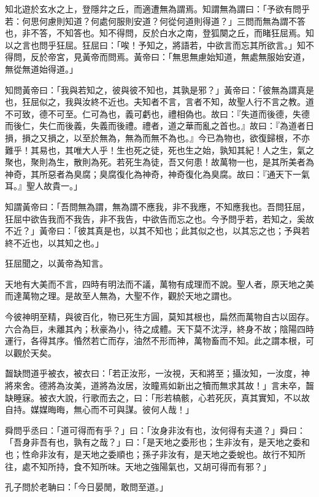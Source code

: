 
\begin{pinyinscope}
知北遊於玄水之上，登隱弅之丘，而適遭無為謂焉。知謂無為謂曰：「予欲有問乎若：何思何慮則知道？何處何服則安道？何從何道則得道？」三問而無為謂不答也，非不答，不知答也。知不得問，反於白水之南，登狐闋之丘，而睹狂屈焉。知以之言也問乎狂屈。狂屈曰：「唉！予知之，將語若，中欲言而忘其所欲言。」知不得問，反於帝宮，見黃帝而問焉。黃帝曰：「無思無慮始知道，無處無服始安道，無從無道始得道。」

知問黃帝曰：「我與若知之，彼與彼不知也，其孰是邪？」黃帝曰：「彼無為謂真是也，狂屈似之，我與汝終不近也。夫知者不言，言者不知，故聖人行不言之教。道不可致，德不可至。仁可為也，義可虧也，禮相偽也。故曰：『失道而後德，失德而後仁，失仁而後義，失義而後禮。禮者，道之華而亂之首也。』故曰：『為道者日損，損之又損之，以至於無為，無為而無不為也。』今已為物也，欲復歸根，不亦難乎！其易也，其唯大人乎！生也死之徒，死也生之始，孰知其紀！人之生，氣之聚也，聚則為生，散則為死。若死生為徒，吾又何患！故萬物一也，是其所美者為神奇，其所惡者為臭腐；臭腐復化為神奇，神奇復化為臭腐。故曰：『通天下一氣耳。』聖人故貴一。」

知謂黃帝曰：「吾問無為謂，無為謂不應我，非不我應，不知應我也。吾問狂屈，狂屈中欲告我而不我告，非不我告，中欲告而忘之也。今予問乎若，若知之，奚故不近？」黃帝曰：「彼其真是也，以其不知也；此其似之也，以其忘之也；予與若終不近也，以其知之也。」

狂屈聞之，以黃帝為知言。

天地有大美而不言，四時有明法而不議，萬物有成理而不說。聖人者，原天地之美而達萬物之理。是故至人無為，大聖不作，觀於天地之謂也。

今彼神明至精，與彼百化，物已死生方圓，莫知其根也，扁然而萬物自古以固存。六合為巨，未離其內；秋豪為小，待之成體。天下莫不沈浮，終身不故；陰陽四時運行，各得其序。惛然若亡而存，油然不形而神，萬物畜而不知。此之謂本根，可以觀於天矣。

齧缺問道乎被衣，被衣曰：「若正汝形，一汝視，天和將至；攝汝知，一汝度，神將來舍。德將為汝美，道將為汝居，汝瞳焉如新出之犢而無求其故！」言未卒，齧缺睡寐。被衣大說，行歌而去之，曰：「形若槁骸，心若死灰，真其實知，不以故自持。媒媒晦晦，無心而不可與謀。彼何人哉！」

舜問乎丞曰：「道可得而有乎？」曰：「汝身非汝有也，汝何得有夫道？」舜曰：「吾身非吾有也，孰有之哉？」曰：「是天地之委形也；生非汝有，是天地之委和也；性命非汝有，是天地之委順也；孫子非汝有，是天地之委蛻也。故行不知所往，處不知所持，食不知所味。天地之強陽氣也，又胡可得而有邪？」

孔子問於老聃曰：「今日晏閒，敢問至道。」


\end{pinyinscope}

